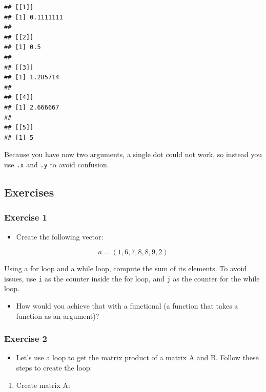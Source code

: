 \documentclass[]{gitbook}
\providecommand{\tightlist}{%
  \setlength{\itemsep}{0pt}\setlength{\parskip}{0pt}}
\begin{document}
\begin{verbatim}
## [[1]]
## [1] 0.1111111
## 
## [[2]]
## [1] 0.5
## 
## [[3]]
## [1] 1.285714
## 
## [[4]]
## [1] 2.666667
## 
## [[5]]
## [1] 5
\end{verbatim}

Because you have now two arguments, a single dot could not work, so instead you use \texttt{.x} and \texttt{.y} to
avoid confusion.

\hypertarget{exercises-5}{%
\subsection{Exercises}\label{exercises-5}}

\hypertarget{exercise-1-5}{%
\subsubsection*{Exercise 1}\label{exercise-1-5}}

\begin{itemize}
\tightlist
\item
  Create the following vector:
\end{itemize}

\[a = (1,6,7,8,8,9,2)\]

Using a for loop and a while loop, compute the sum of its elements. To avoid issues, use \texttt{i}
as the counter inside the for loop, and \texttt{j} as the counter for the while loop.

\begin{itemize}
\tightlist
\item
  How would you achieve that with a functional (a function that takes a function as an argument)?
\end{itemize}

\hypertarget{exercise-2-3}{%
\subsubsection*{Exercise 2}\label{exercise-2-3}}

\begin{itemize}
\tightlist
\item
  Let's use a loop to get the matrix product of a matrix A and B. Follow these steps to create the loop:
\end{itemize}

\begin{enumerate}
\def\labelenumi{\arabic{enumi})}
\tightlist
\item
  Create matrix A:
\end{enumerate}
\end{document}
